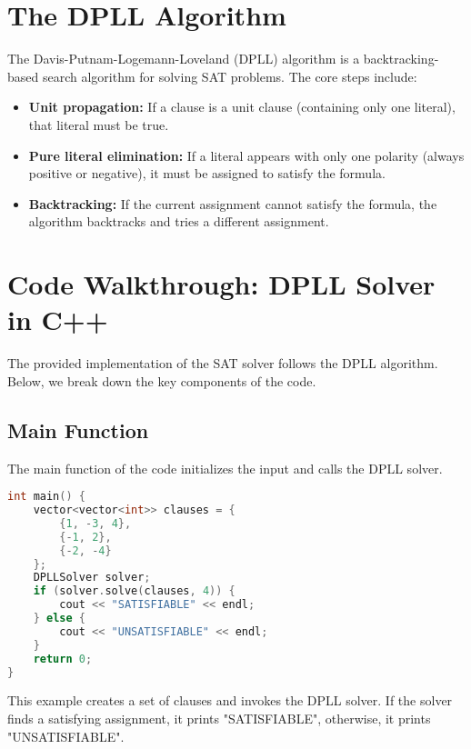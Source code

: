 \documentclass[12pt]{article}
\begin{document}
\section{The DPLL Algorithm}
The Davis-Putnam-Logemann-Loveland (DPLL) algorithm is a backtracking-based search algorithm for solving SAT problems. The core steps include:
\begin{itemize}
    \item \textbf{Unit propagation:} If a clause is a unit clause (containing only one literal), that literal must be true.
    \item \textbf{Pure literal elimination:} If a literal appears with only one polarity (always positive or negative), it must be assigned to satisfy the formula.
    \item \textbf{Backtracking:} If the current assignment cannot satisfy the formula, the algorithm backtracks and tries a different assignment.
\end{itemize}

\section{Code Walkthrough: DPLL Solver in C++}
The provided implementation of the SAT solver follows the DPLL algorithm. Below, we break down the key components of the code.

\subsection{Main Function}
The main function of the code initializes the input and calls the DPLL solver.
\begin{lstlisting}[language=C++]
int main() {
    vector<vector<int>> clauses = {
        {1, -3, 4},
        {-1, 2},
        {-2, -4}
    };
    DPLLSolver solver;
    if (solver.solve(clauses, 4)) {
        cout << "SATISFIABLE" << endl;
    } else {
        cout << "UNSATISFIABLE" << endl;
    }
    return 0;
}
\end{lstlisting}

This example creates a set of clauses and invokes the DPLL solver. If the solver finds a satisfying assignment, it prints "SATISFIABLE", otherwise, it prints "UNSATISFIABLE".
\end{document}
